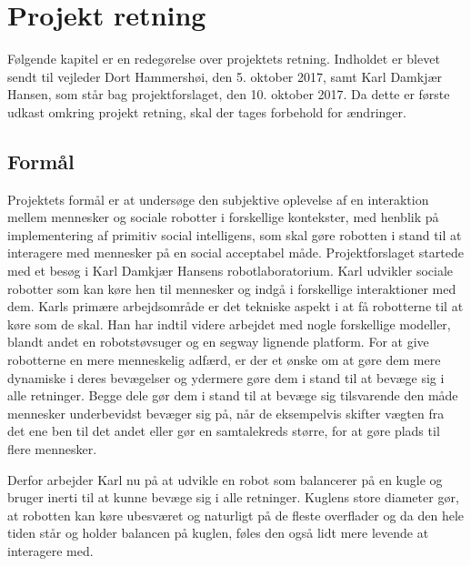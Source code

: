 \chapter{Projekt retning}
\label{ProjektRetning}
%
Følgende kapitel er en redegørelse over projektets retning. Indholdet er blevet sendt til vejleder Dort Hammershøi, den 5. oktober 2017, samt Karl Damkjær Hansen, som står bag projektforslaget, den 10. oktober 2017. Da dette er første udkast omkring projekt retning, skal der tages forbehold for ændringer.
%
\section{Formål}
\label{ProjektRetningFormaal}
%
Projektets formål er at undersøge den subjektive oplevelse af en interaktion mellem mennesker og sociale robotter i forskellige kontekster, med henblik på implementering af primitiv social intelligens, som skal gøre robotten i stand til at interagere med mennesker på en social acceptabel måde.\blankline
%
Projektforslaget startede med et besøg i Karl Damkjær Hansens robotlaboratorium. Karl udvikler sociale robotter som kan køre hen til mennesker og indgå i forskellige interaktioner med dem. Karls primære arbejdsområde er det tekniske aspekt i at få robotterne til at køre som de skal. Han har indtil videre arbejdet med nogle forskellige modeller, blandt andet en robotstøvsuger og en segway lignende platform. For at give robotterne en mere menneskelig adfærd, er der et ønske om at gøre dem mere dynamiske i deres bevægelser og ydermere gøre dem i stand til at bevæge sig i alle retninger. Begge dele gør dem i stand til at bevæge sig tilsvarende den måde mennesker underbevidst bevæger sig på, når de eksempelvis skifter vægten fra det ene ben til det andet eller gør en samtalekreds større, for at gøre plads til flere mennesker. 

Derfor arbejder Karl nu på at udvikle en robot som balancerer på en kugle og bruger inerti til at kunne bevæge sig i alle retninger. Kuglens store diameter gør, at robotten kan køre ubesværet og naturligt på de fleste overflader og da den hele tiden står og holder balancen på kuglen, føles den også lidt mere levende at interagere med.
%
